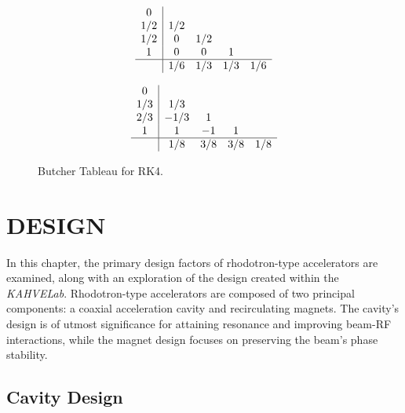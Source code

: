 \documentclass[a4paper,oneside,12pt]{report}
\numberwithin{equation}{chapter}
\begin{document}
\begin{figure}[h!]
    \centering
    \begin{minipage}{.5\textwidth}
        \[ 
        \begin{array} 
            {c|cccc}
            0\\
            1/2 & 1/2 \\
            1/2 & 0 & 1/2 \\
            1   & 0 & 0 & 1\\
            \hline
            & 1/6 & 1/3 & 1/3 & 1/6
        \end{array}
        \]  
    \end{minipage}%
    \begin{minipage}{.5\textwidth}
        \[ 
        \begin{array} 
            {c|cccc}
            0\\
            1/3 & 1/3 \\
            2/3 & -1/3 & 1 \\
            1   & 1 & -1 & 1\\
            \hline
            & 1/8 & 3/8 & 3/8 & 1/8
        \end{array}
        \]  
    \end{minipage}
    \vspace{0pt}
    \caption{Butcher Tableau for RK4.}
    \label{fig:Butcher-RK4}
\end{figure}



\newpage


\chapter{DESIGN}


In this chapter, the primary design factors of rhodotron-type accelerators are examined, along with an exploration of the design created within the \textit{KAHVELab}. 
Rhodotron-type accelerators are composed of two principal components: a coaxial acceleration cavity and recirculating magnets. 
The cavity's design is of utmost significance for attaining resonance and improving beam-RF interactions, while the magnet design focuses on preserving the beam's phase stability.

\section{Cavity Design} \label{sec:cavity_design}
\end{document}
